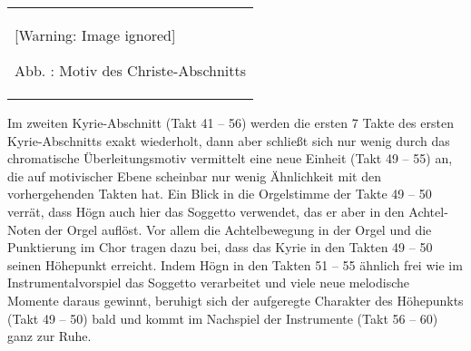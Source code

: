 \documentclass[a4paper]{article}
\newcounter{Abb}
\renewcommand\theAbb{\arabic{Abb}}
\begin{document}
\begin{center}
\begin{minipage}{4.394cm}
\begin{flushleft}
\tablefirsthead{}
\tablehead{}
\tabletail{}
\tablelasttail{}
\begin{supertabular}{m{4.1940002cm}}
  [Warning: Image ignored] %
 
Abb. \stepcounter{Abb}{\theAbb}: Motiv des Christe-Abschnitts\\
\end{supertabular}
\end{flushleft}
\end{minipage}
\end{center}
Im zweiten Kyrie-Abschnitt (Takt 41 – 56) werden die ersten 7 Takte des
ersten Kyrie-Abschnitts exakt wiederholt, dann aber schließt sich nur
wenig durch das chromatische Überleitungsmotiv vermittelt eine neue
Einheit (Takt 49 – 55) an, die auf motivischer Ebene scheinbar nur
wenig Ähnlichkeit mit den vorhergehenden Takten hat. Ein Blick in die
Orgelstimme der Takte 49 – 50 verrät, dass Högn auch hier das Soggetto
verwendet, das er aber in den Achtel-Noten der Orgel auflöst. Vor allem
die Achtelbewegung in der Orgel und die Punktierung im Chor tragen dazu
bei, dass das Kyrie in den Takten 49 – 50 seinen Höhepunkt erreicht.
Indem Högn in den Takten 51 – 55 ähnlich frei wie im
Instrumentalvorspiel das Soggetto verarbeitet und viele neue melodische
Momente daraus gewinnt, beruhigt sich der aufgeregte Charakter des
Höhepunkts (Takt 49 – 50) bald und kommt im Nachspiel der Instrumente
(Takt 56 – 60) ganz zur Ruhe.
\end{document}
